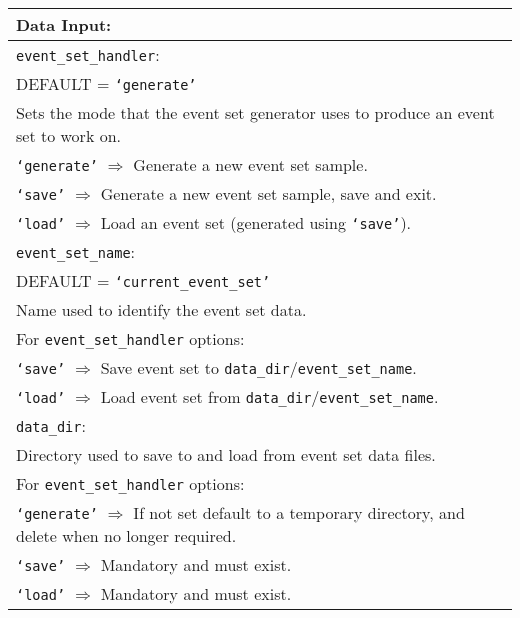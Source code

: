 \vspace{2em}
\begin{tabular}{|p{\textwidth}|}
\hline
\vspace{0.3em} \noindent \Large \textbf{Data Input:} \normalsize \\
\hline \vspace{0.1em} \texttt{event\_set\_handler}: \\
DEFAULT = \texttt{`generate'} \\
Sets the mode that the event set generator uses to produce an event set to work
on. \\
 \hspace{0.5em} \texttt{`generate'} $\Rightarrow$ Generate a new event set
 sample. \\
 \hspace{0.5em} \texttt{`save'} $\Rightarrow$ Generate a new event set sample,
 save and exit. \\
 \hspace{0.5em} \texttt{`load'} $\Rightarrow$ Load an event set (generated using
 \texttt{`save'}). \\
\hline \vspace{0.1em} \texttt{event\_set\_name}: \\
DEFAULT = \texttt{`current\_event\_set'} \\
Name used to identify the event set data. \\
For \texttt{event\_set\_handler} options: \\
 \hspace{0.5em} \texttt{`save'} $\Rightarrow$ Save event set to
 \texttt{data\_dir}/\texttt{event\_set\_name}. \\
 \hspace{0.5em} \texttt{`load'} $\Rightarrow$ Load event set from
 \texttt{data\_dir}/\texttt{event\_set\_name}. \\
\hline \vspace{0.1em} \texttt{data\_dir}: \\
Directory used to save to and load from event set data files. \\
For \texttt{event\_set\_handler} options: \\
 \hspace{0.5em} \texttt{`generate'} $\Rightarrow$ If not set default to a
 temporary directory, and delete when no longer required. \\
 \hspace{0.5em} \texttt{`save'} $\Rightarrow$ Mandatory and must exist. \\
 \hspace{0.5em} \texttt{`load'} $\Rightarrow$ Mandatory and must exist. \\
 
\hline
 \end{tabular}
 
